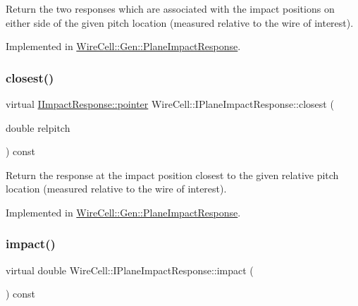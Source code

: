 Return the two responses which are associated with the impact positions on either side of the given pitch location (measured relative to the wire of interest). 

Implemented in \hyperlink{class_wire_cell_1_1_gen_1_1_plane_impact_response_aa33dc4d2ab03046b055a8a8843fc07bd}{Wire\+Cell\+::\+Gen\+::\+Plane\+Impact\+Response}.

\mbox{\label{class_wire_cell_1_1_i_plane_impact_response_acae9f97e8ec30523c563bd90a66b4eab}} 
\subsubsection{\texorpdfstring{closest()}{closest()}}
{\footnotesize\ttfamily virtual \hyperlink{class_wire_cell_1_1_interface_a09c548fb8266cfa39afb2e74a4615c37}{I\+Impact\+Response\+::pointer} Wire\+Cell\+::\+I\+Plane\+Impact\+Response\+::closest (\begin{DoxyParamCaption}\item[{double}]{relpitch }\end{DoxyParamCaption}) const\hspace{0.3cm}{\ttfamily [pure virtual]}}

Return the response at the impact position closest to the given relative pitch location (measured relative to the wire of interest). 

Implemented in \hyperlink{class_wire_cell_1_1_gen_1_1_plane_impact_response_a1f0049663133e90f7c3b30f7dda63943}{Wire\+Cell\+::\+Gen\+::\+Plane\+Impact\+Response}.

\mbox{\label{class_wire_cell_1_1_i_plane_impact_response_a3259cbe4883bce2cb4010e0667ec957b}} 
\subsubsection{\texorpdfstring{impact()}{impact()}}
{\footnotesize\ttfamily virtual double Wire\+Cell\+::\+I\+Plane\+Impact\+Response\+::impact (\begin{DoxyParamCaption}{ }\end{DoxyParamCaption}) const\hspace{0.3cm}{\ttfamily [pure virtual]}}



